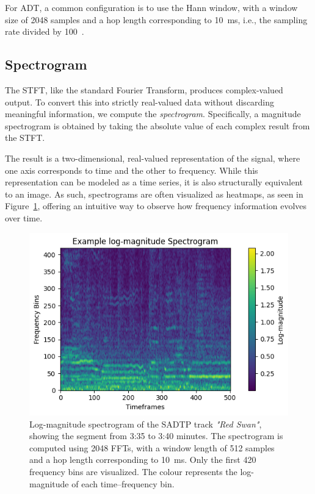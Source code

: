 For \gls{ADT}, a common configuration is to use the Hann window, with a window size of 2048 samples and a hop length corresponding to 10~ms, i.e., the sampling rate divided by 100~\cite{8350302, vogl2016recurrent,vogl2018multiinstrumentdrumtranscription, signals4040042}.

\subsection{Spectrogram}

The \gls{STFT}, like the standard Fourier Transform, produces complex-valued output. To convert this into strictly real-valued data without discarding meaningful information, we compute the \textit{spectrogram}. Specifically, a magnitude spectrogram is obtained by taking the absolute value of each complex result from the \gls{STFT}.

The result is a two-dimensional, real-valued representation of the signal, where one axis corresponds to time and the other to frequency. While this representation can be modeled as a time series, it is also structurally equivalent to an image. As such, spectrograms are often visualized as heatmaps, as seen in Figure~\ref{SpectrogramFigure}, offering an intuitive way to observe how frequency information evolves over time.

\begin{figure}[H]
    \centering
    \includegraphics[scale=1.1]{figures/logspectrogram}
    \caption{Log-magnitude spectrogram of the SADTP track \textit{"Red Swan"}, showing the segment from 3:35 to 3:40 minutes. The spectrogram is computed using 2048 \glspl{FFT}, with a window length of 512 samples and a hop length corresponding to 10~ms. Only the first 420 frequency bins are visualized. The colour represents the log-magnitude of each time–frequency bin.}
    \label{SpectrogramFigure}
\end{figure}

